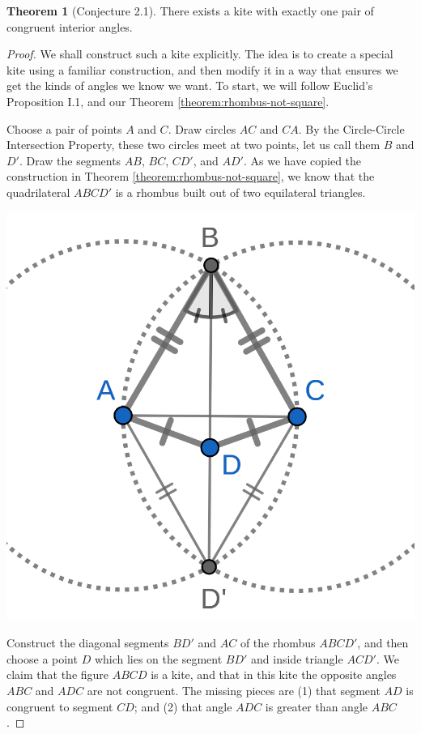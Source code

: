 \documentclass{tufte-handout}
\theoremstyle{definition}
\newtheorem{theorem}{Theorem}[section]
\begin{document}
\begin{theorem}[Conjecture 2.1]\label{theorem:kites-2}
There exists a kite with exactly one pair of congruent interior angles.
\end{theorem}

\begin{proof} We shall construct such a kite explicitly.
The idea is to create a special kite using a familiar construction, and then modify it in a way that ensures we get the kinds of angles we know we want. To start, we will follow Euclid's Proposition I.1, and our Theorem \ref{theorem:rhombus-not-square}.

Choose a pair of points $A$ and $C$. Draw circles $AC$ and $CA$. By the Circle-Circle Intersection Property, these two circles meet at two points, let us call them $B$ and $D'$. Draw the segments $AB$, $BC$, $CD'$, and $AD'$. As we have copied the construction in Theorem \ref{theorem:rhombus-not-square}, we know that the quadrilateral $ABCD'$ is a rhombus built out of two equilateral triangles.

\begin{marginfigure}
  \includegraphics{images/kite_1.png}
\end{marginfigure}

Construct the diagonal segments $BD'$ and $AC$ of the rhombus $ABCD'$, and then choose a point $D$ which lies on the segment $BD'$ and inside triangle $ACD'$. We claim that the figure $ABCD$ is a kite, and that in this kite the opposite angles $ABC$ and $ADC$ are not congruent. The missing pieces are (1) that segment $AD$ is congruent to segment $CD$; and (2) that angle $ADC$ is greater than angle $ABC$.


\end{proof}
\end{document}
